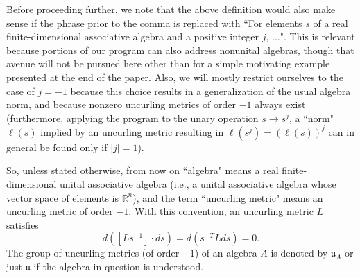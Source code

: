 \documentclass{amsart}
\numberwithin{equation}{section}
\theoremstyle{definition}
\numberwithin{theorem}{section}
\begin{document}
   Before proceeding further, we note that the above definition would also make sense if the phrase prior to the comma is replaced with ``For elements $s$ of a real finite-dimensional associative algebra and a positive integer $j$, $\dots$".
     This is relevant because portions of our program can also address nonunital algebras, though that avenue will not be pursued here other than for a simple motivating example presented at the end of the paper.  Also, we will mostly restrict ourselves to the case of $j=-1$ because this choice results in a generalization of the usual algebra norm, and because nonzero uncurling metrics of order $-1$ always exist (furthermore, applying the program to the unary operation $s\rightarrow s^j$, a ``norm" $\ell(s)$ implied by an uncurling metric resulting in  $\ell(s^j) = (\ell(s))^j$ can in general be found only if $|j|=1$).
     
     So, unless stated otherwise, from now on ``algebra" means a real finite-dimensional unital associative algebra (i.e., a unital associative algebra whose vector space of elements is $\mathbb{R}^n$), and the term ``uncurling metric" means an uncurling metric of order $-1$.  With this convention, an uncurling metric $L$ satisfies \begin{equation}\label{4/7/23.1} d([Ls^{-1}]\cdot ds) = d\left(s^{-T} L ds\right) = 0. \end{equation}  
  The group of uncurling metrics (of order $-1$) of an algebra $A$ is denoted by $\mathfrak{u}_A$ or just $\mathfrak{u}$ if the algebra in question is understood.
     
\end{document}
